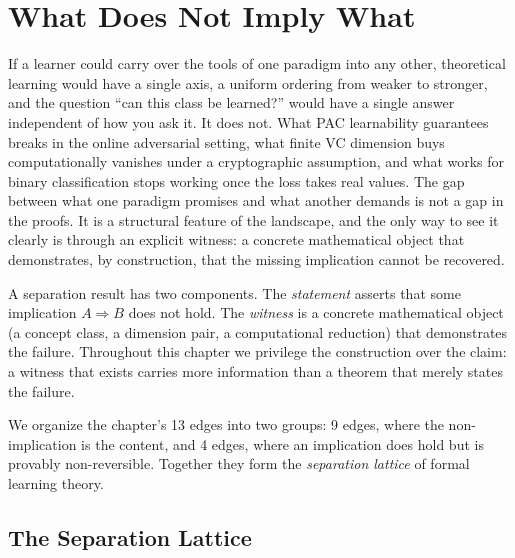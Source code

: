 
\chapter{What Does Not Imply What}
\label{ch:separations}

If a learner could carry over the tools of one paradigm into any other,
theoretical learning would have a single axis, a uniform ordering from
weaker to stronger, and the question ``can this class be learned?'' would
have a single answer independent of how you ask it. It does not. What PAC
learnability guarantees breaks in the online adversarial setting, what
finite VC dimension buys computationally vanishes under a cryptographic
assumption, and what works for binary classification stops working once
the loss takes real values. The gap between what one paradigm promises
and what another demands is not a gap in the proofs. It is a structural
feature of the landscape, and the only way to see it clearly is through
an explicit witness: a concrete mathematical object that demonstrates,
by construction, that the missing implication cannot be recovered.

A separation result has two components. The \emph{statement} asserts
that some implication $A \Rightarrow B$ does not hold. The
\emph{witness} is a concrete mathematical object (a concept class,
a dimension pair, a computational reduction) that demonstrates the
failure. Throughout this chapter we privilege the construction over the
claim: a witness that exists carries more information than a theorem that
merely states the failure.

We organize the chapter's 13 edges into two groups: 9
 edges, where the non-implication is the content,
and 4  edges, where an implication does hold but
is provably non-reversible. Together they form the \emph{separation
lattice} of formal learning theory.


\section{The Separation Lattice}
\label{sec:sep-lattice}

